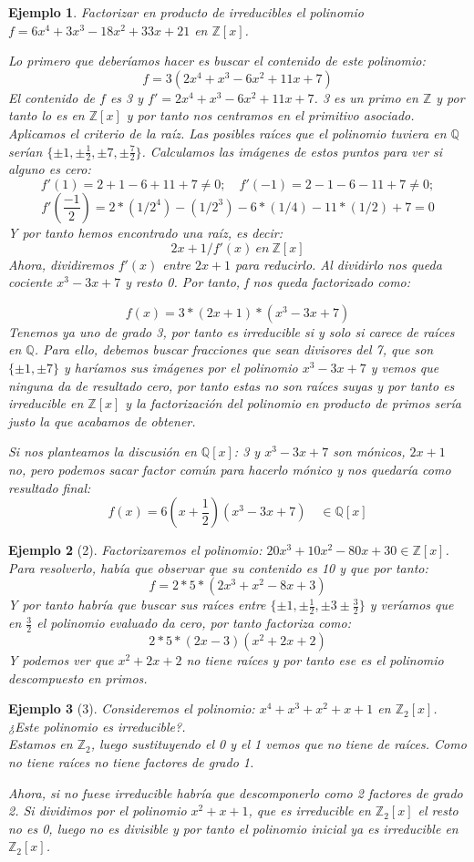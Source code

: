 \documentclass[11pt, a4paper, titlepage]{article}
\newif\IfInSansMode
\providecommand{\ent}{\mathbb{Z}}
\providecommand{\rac}{\mathbb{Q}}
\theoremstyle{theorem-style}
\theoremstyle{definition-style}
\theoremstyle{remark-style}
\theoremstyle{example-style}
\newtheorem{ejemplo}{Ejemplo}[section]
\begin{document}
\begin{ejemplo}
	Factorizar en producto de irreducibles el polinomio $f=6x^4+3x^3-18x^2+33x+21$ en $\ent[x]$.

Lo primero que deberíamos hacer es buscar el contenido de este polinomio:
\[
f=3(2x^4+x^3-6x^2+11x+7)
\]
El contenido de $f$ es 3 y $f'=2x^4+x^3-6x^2+11x+7$. 3 es un primo en $\ent $ y por tanto lo es en $\ent[x]$ y por tanto nos centramos en el primitivo asociado. Aplicamos el criterio de la raíz. Las posibles raíces que el polinomio tuviera en $\rac$ serían $\{\pm 1, \pm \frac{1}{2}, \pm 7, \pm \frac{7}{2}\}$. Calculamos las imágenes de estos puntos para ver si alguno es cero:
\[
f'(1) = 2+1-6+11 + 7 \ne 0; \quad f'(-1) = 2-1-6-11+7 \ne 0;\]
\[f'(\frac{-1}{2}) = 2*(1/2^4)-(1/2^3)-6*(1/4)-11*(1/2) + 7 = 0
\]
Y por tanto hemos encontrado una raíz, es decir:
\[
2x+1/f'(x) \ en \ \ent[x]
\]
Ahora, dividiremos $f'(x)$ entre $2x+1$ para reducirlo. Al dividirlo nos queda cociente $x^3-3x+7$ y resto 0. Por tanto, f nos queda factorizado como:

\[
f(x)=3*(2x+1)*(x^3-3x+7)
\]
Tenemos ya uno de grado 3, por tanto es irreducible si y solo si carece de raíces en $\rac$. Para ello, debemos buscar fracciones que sean divisores del 7, que son $\{\pm 1, \pm 7\}$ y haríamos sus imágenes por el polinomio $x^3-3x+7$ y vemos que ninguna da de resultado cero, por tanto estas no son raíces suyas y por tanto es irreducible en $\ent[x]$ y la factorización del polinomio en producto de primos sería justo la que acabamos de obtener.

Si nos planteamos la discusión en $\rac[x]$: 3 y $x^3-3x+7$ son mónicos, $2x+1$ no, pero podemos sacar factor común para hacerlo mónico y nos quedaría como resultado final:
\[
f(x)= 6(x+\frac{1}{2})(x^3-3x+7) \quad \in \rac[x]
\]
\end{ejemplo}
\begin{ejemplo}[2]
	Factorizaremos el polinomio: $20x^3 +10x^2-80x+30 \in \ent[x]$. Para resolverlo, había que observar que su contenido es 10 y que por tanto:
	\[
	f=2*5*(2x^3+x^2-8x+3)
	\]
	Y por tanto habría que buscar sus raíces entre $\{\pm 1, \pm \frac{1}{2}, \pm 3 \pm \frac{3}{2}\}$ y veríamos que en $\frac{3}{2}$ el polinomio evaluado da cero, por tanto factoriza como:
	\[
	2*5*(2x-3)(x^2+2x+2)
	\]
	Y podemos ver que $x^2+2x+2$ no tiene raíces y por tanto ese es el polinomio descompuesto en primos.
\end{ejemplo}
\begin{ejemplo}[3]
	Consideremos el polinomio: $x^4+x^3+x^2+x+1$ en $\ent_2[x]$. ¿Este polinomio es irreducible?. \\Estamos en $\ent_2$, luego sustituyendo el 0 y el 1 vemos que no tiene de raíces. Como no tiene raíces no tiene factores de grado 1.

	Ahora, si no fuese irreducible habría que descomponerlo como 2 factores de grado 2. Si dividimos por el polinomio $x^2+x+1$, que es irreducible en $\ent_2[x]$ el resto no es 0, luego no es divisible y por tanto el polinomio inicial ya es irreducible en $\ent_2[x]$.
\end{ejemplo}
\end{document}
